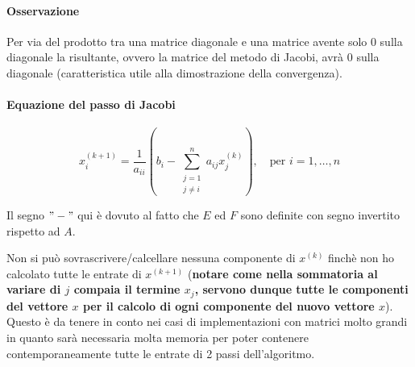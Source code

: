 \documentclass[12pt,a4paper,]{report}
\begin{document}
\paragraph{Osservazione}
Per via del prodotto tra una matrice diagonale e una matrice avente solo 0 sulla diagonale la risultante, ovvero la matrice del metodo di Jacobi, avrà 0 sulla diagonale (caratteristica utile alla dimostrazione della convergenza).

\paragraph{Equazione del passo di Jacobi}
\[
x_i^{(k+1)} = \frac{1}{a_{ii}} \left( b_i - \sum_{\substack{j=1 \\ j \neq i}}^{n} a_{ij} x_j^{(k)} \right), \quad \text{per } i = 1, \dots, n
\]
\begin{nota}
    Il segno $"-"$ qui è dovuto al fatto che $E$ ed $F$ sono definite con segno invertito rispetto ad $A$.
\end{nota}
\begin{nota}
    Non si può sovrascrivere/calcellare nessuna componente di $x^{(k)}$ finchè non ho calcolato tutte le entrate di $x^{(k+1)}$ (\textbf{notare come nella sommatoria al variare di $j$ compaia il termine $x_j$, servono dunque tutte le componenti del vettore $x$ per il calcolo di ogni componente del nuovo vettore $x$}).
    Questo è da tenere in conto nei casi di implementazioni con matrici molto grandi in quanto sarà necessaria molta memoria per poter contenere contemporaneamente tutte le entrate di 2 passi dell'algoritmo.
\end{nota}
\end{document}
